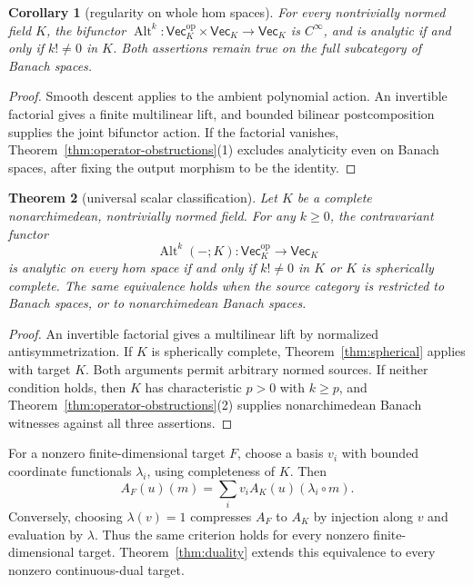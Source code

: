 \documentclass[11pt]{amsart}
\newtheorem{theorem}{Theorem}[section]
\newtheorem{corollary}[theorem]{Corollary}
\theoremstyle{definition}
\theoremstyle{remark}
\numberwithin{equation}{section}
\newcommand{\Alt}{\operatorname{Alt}}
\begin{document}
\begin{corollary}[regularity on whole hom spaces]\label{cor:classification}
For every nontrivially normed field $K$, the bifunctor
$\Alt^k\colon\mathsf{Vec}_K^{\mathrm{op}}\times\mathsf{Vec}_K\to\mathsf{Vec}_K$
is $C^\infty$, and is analytic if and only if $k!\ne0$ in $K$.
Both assertions remain true on the full subcategory of Banach spaces.
\end{corollary}
\begin{proof}
Smooth descent applies to the ambient polynomial action. An invertible factorial gives a finite
multilinear lift, and bounded bilinear postcomposition supplies the joint bifunctor action.
If the factorial vanishes, Theorem~\ref{thm:operator-obstructions}(1) excludes analyticity even on
Banach spaces, after fixing the output morphism to be the identity.
\end{proof}

\begin{theorem}[universal scalar classification]\label{thm:scalar-classification}
Let $K$ be a complete nonarchimedean, nontrivially normed field. For any $k\ge0$, the contravariant functor
\[
 \Alt^k(-;K)\colon\mathsf{Vec}_K^{\mathrm{op}}\longrightarrow\mathsf{Vec}_K
\]
is analytic on every hom space if and only if $k!\ne0$ in $K$ or $K$ is spherically complete. The same equivalence holds when the source category is restricted to Banach spaces, or to nonarchimedean Banach spaces.
\end{theorem}

\begin{proof}
An invertible factorial gives a multilinear lift by normalized antisymmetrization. If $K$ is spherically complete, Theorem~\ref{thm:spherical} applies with target $K$. Both arguments permit arbitrary normed sources. If neither condition holds, then $K$ has characteristic $p>0$ with $k\ge p$, and Theorem~\ref{thm:operator-obstructions}(2) supplies nonarchimedean Banach witnesses against all three assertions.
\end{proof}

For a nonzero finite-dimensional target $F$, choose a basis $v_i$ with bounded coordinate functionals
$\lambda_i$, using completeness of $K$. Then
\[
 A_F(u)(m)=\sum_i v_i A_K(u)(\lambda_i\circ m).
\]
Conversely, choosing $\lambda(v)=1$ compresses $A_F$ to $A_K$ by injection along $v$ and evaluation
by $\lambda$. Thus the same criterion holds for every nonzero finite-dimensional target.
Theorem~\ref{thm:duality} extends this equivalence to every nonzero continuous-dual target.
\end{document}
